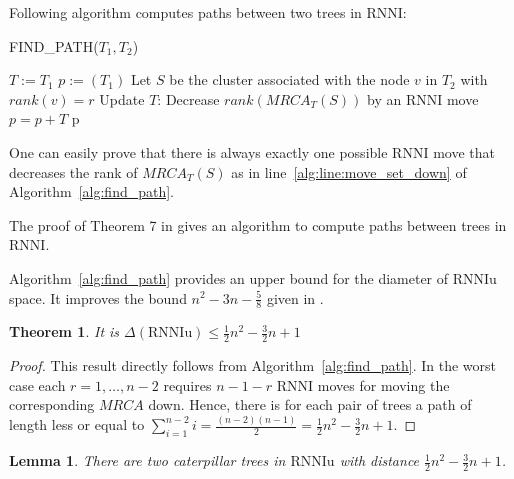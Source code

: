 \documentclass[11pt, a4paper]{article}
\newcommand{\rnni}{\mathrm{RNNI}}
\newcommand{\rnniu}{\mathrm{RNNIu}}
\newtheorem{theorem}[definition]{Theorem}
\newtheorem{lemma}[definition]{Lemma}
\begin{document}
Following algorithm computes paths between two trees in $\rnni$:

\begin{algorithm}[H]
\caption{FIND\_PATH($T_1,T_2$)}
\label{alg:find_path}
\begin{algorithmic}[1]
	\STATE $T := T_1$
	\STATE $p := (T_1)$
		\STATE Let $S$ be the cluster associated with the node $v$ in $T_2$ with $rank(v) = r$
			\STATE Update $T$: Decrease $rank(MRCA_T(S))$ by an $\rnni$ move \label{alg:line:move_set_down}
			\STATE $p = p+T$
		\ENDWHILE
	\ENDFOR
	\RETURN p
\end{algorithmic}
\end{algorithm}

One can easily prove that there is always exactly one possible $\rnni$ move that decreases the rank of $MRCA_T(S)$ as in line~\ref{alg:line:move_set_down} of Algorithm~\ref{alg:find_path}.

The proof of Theorem 7 in \cite{Gavryushkin2017} gives an algorithm to compute paths between trees in $\rnni$.



Algorithm~\ref{alg:find_path} provides an upper bound for the diameter of $\rnniu$ space.
It improves the bound $n^2 - 3n - \frac{5}{8}$ given in \cite{Gavryushkin2017}.

\begin{theorem}
	It is $\Delta(\rnniu) \leq \frac{1}{2}n^2-\frac{3}{2}n+1$
\end{theorem}

\begin{proof}
	This result directly follows from Algorithm~\ref{alg:find_path}.
	In the worst case each $r = 1, \dots, n-2$ requires $n-1-r$ $\rnni$ moves for moving the corresponding $MRCA$ down.
	Hence, there is for each pair of trees a path of length less or equal to $\sum\limits_{i = 1}^{n-2} i = \frac{(n-2)(n-1)}{2} = \frac{1}{2}n^2-\frac{3}{2}n+1$.
\end{proof}

\begin{lemma}
	There are two caterpillar trees in $\rnniu$ with distance $\frac{1}{2}n^2-\frac{3}{2}n+1$.
	\label{conj:caterpillar_diameter}
\end{lemma}
\end{document}
